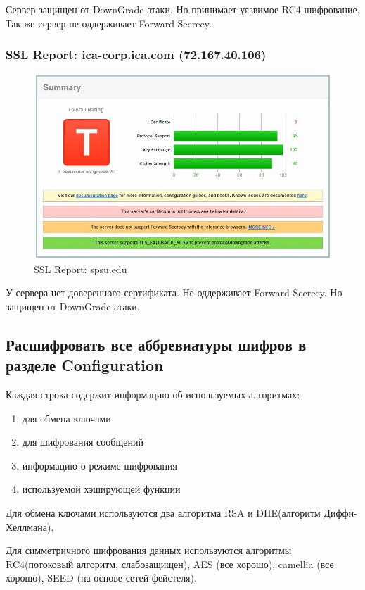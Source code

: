 \documentclass[10pt,a4paper]{article}
\begin{document}
Сервер защищен от DownGrade атаки. Но принимает уязвимое RC4 шифрование. Так же сервер не оддерживает Forward Secrecy.


\subsubsection{SSL Report: ica-corp.ica.com (72.167.40.106)}

\begin{figure}[h!]
\centering
\includegraphics[scale=0.6]{2.jpg}
\caption{SSL Report: spsu.edu}
\end{figure}

У сервера нет доверенного сертификата. Не оддерживает Forward Secrecy. Но защищен от DownGrade атаки.

\subsection{Расшифровать все аббревиатуры шифров в разделе Configuration}

Каждая строка содержит информацию об используемых алгоритмах:
\begin{enumerate}
\item для обмена ключами
\item для шифрования сообщений
\item информацию о режиме шифрования
\item используемой хэширующей функции
\end{enumerate}

Для обмена ключами используются два алгоритма RSA и DHE(алгоритм Диффи-Хеллмана).

Для симметричного шифрования данных используются алгоритмы RC4(потоковый алгоритм, слабозащищен), AES (все хорошо), camellia (все хорошо), SEED (на основе сетей фейстеля).
\end{document}
